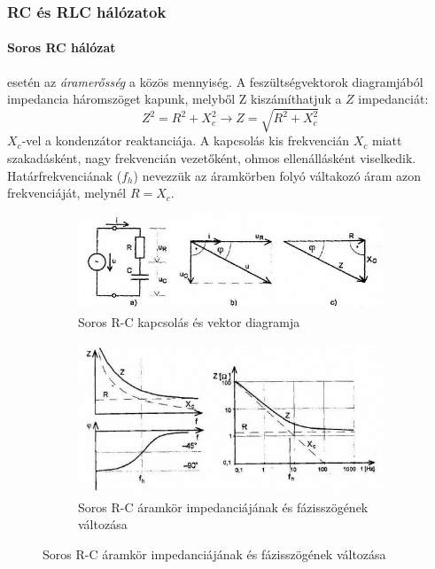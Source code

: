 \subsubsection{RC és RLC hálózatok}
\paragraph{Soros RC hálózat} esetén az \emph{áramerősség} a közös mennyiség. A feszültségvektorok diagramjából impedancia háromszöget kapunk, melyből Z kiszámíthatjuk a $Z$ impedanciát:
$$Z^2 = R^2 + X_c^2 \rightarrow Z = \sqrt{R^2 + X_c^2}$$
$X_c$-vel a kondenzátor reaktanciája.
A kapcsolás kis frekvencián $X_c$ miatt szakadásként, nagy frekvencián vezetőként, ohmos ellenállásként viselkedik. Határfrekvenciának ($f_h$) nevezzük az áramkörben folyó váltakozó áram azon frekvenciáját, melynél $ R = X_c$.
\begin{figure}[h]
	\centering
	\begin{subfigure}[b]{0.45\textwidth}
		\includegraphics[width=\linewidth]{fig/10-serialRC_Schematic}
		\caption{Soros R-C kapcsolás és vektor diagramja}
		\label{fig:10-serialrcschematic}
	\end{subfigure}
	\begin{subfigure}[b]{0.45\textwidth}
		\includegraphics[width=\linewidth]{fig/10-serialRC_Plot}
		\caption{Soros R-C áramkör impedanciájának és fázisszögének változása}
		\label{fig:10-serialrcplot}
	\end{subfigure}
\end{figure}


